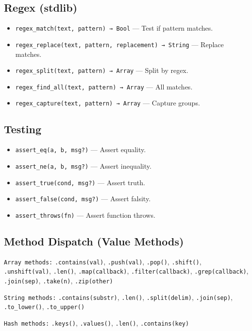 \subsection{Regex (stdlib)}
\begin{itemize}
    \item \texttt{regex\_match(text, pattern) → Bool} — Test if pattern matches.
    \item \texttt{regex\_replace(text, pattern, replacement) → String} — Replace matches.
    \item \texttt{regex\_split(text, pattern) → Array} — Split by regex.
    \item \texttt{regex\_find\_all(text, pattern) → Array} — All matches.
    \item \texttt{regex\_capture(text, pattern) → Array} — Capture groups.
\end{itemize}

\subsection{Testing}
\begin{itemize}
    \item \texttt{assert\_eq(a, b, msg?)} — Assert equality.
    \item \texttt{assert\_ne(a, b, msg?)} — Assert inequality.
    \item \texttt{assert\_true(cond, msg?)} — Assert truth.
    \item \texttt{assert\_false(cond, msg?)} — Assert falsity.
    \item \texttt{assert\_throws(fn)} — Assert function throws.
\end{itemize}

\subsection{Method Dispatch (Value Methods)}
\texttt{Array methods:} \texttt{.contains(val)}, \texttt{.push(val)}, \texttt{.pop()}, \texttt{.shift()}, \texttt{.unshift(val)}, \texttt{.len()}, \texttt{.map(callback)}, \texttt{.filter(callback)}, \texttt{.grep(callback)}, \texttt{.join(sep)}, \texttt{.take(n)}, \texttt{.zip(other)}

\texttt{String methods:} \texttt{.contains(substr)}, \texttt{.len()}, \texttt{.split(delim)}, \texttt{.join(sep)}, \texttt{.to\_lower()}, \texttt{.to\_upper()}

\texttt{Hash methods:} \texttt{.keys()}, \texttt{.values()}, \texttt{.len()}, \texttt{.contains(key)}

